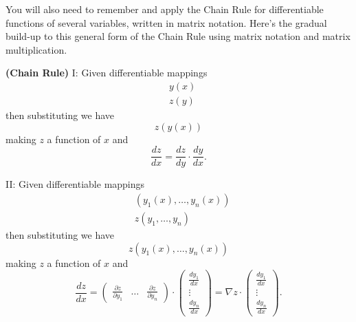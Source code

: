 \documentclass{ximera}
\begin{document}
You will also need to remember and apply the Chain Rule for differentiable
functions of several variables, written in matrix notation. Here's the
gradual build-up to this general form of the Chain Rule using matrix
notation and matrix multiplication.

\begin{theorem}
\textbf{(Chain Rule)} I: Given differentiable mappings%
\begin{align*}
& y\left( x\right) \\
& z\left( y\right)
\end{align*}
then substituting we have%
\begin{equation*}
z\left( y\left( x\right) \right) 
\end{equation*}
making $z$ a function of $x$ and%
\begin{equation*}
\frac{dz}{dx}=\frac{dz}{dy}\cdot\frac{dy}{dx}. 
\end{equation*}

II: Given differentiable mappings%
\begin{align*}
& \left( y_{1}\left( x\right) ,\ldots,y_{n}\left( x\right) \right) \\
& z\left( y_{1},\ldots,y_{n}\right)
\end{align*}
then substituting we have%
\begin{equation*}
z\left( y_{1}\left( x\right) ,\ldots,y_{n}\left( x\right) \right) 
\end{equation*}
making $z$ a function of $x$ and%
\begin{equation*}
\frac{dz}{dx}=\left( 
\begin{array}{ccc}
\frac{\partial z}{\partial y_{1}} & \ldots & \frac{\partial z}{\partial y_{n}%
}%
\end{array}
\right) \cdot\left( 
\begin{array}{c}
\frac{dy_{1}}{dx} \\ 
\vdots \\ 
\frac{dy_{n}}{dx}%
\end{array}
\right) =\nabla z\cdot\left( 
\begin{array}{c}
\frac{dy_{1}}{dx} \\ 
\vdots \\ 
\frac{dy_{n}}{dx}%
\end{array}
\right) . 
\end{equation*}


\end{theorem}
\end{document}
